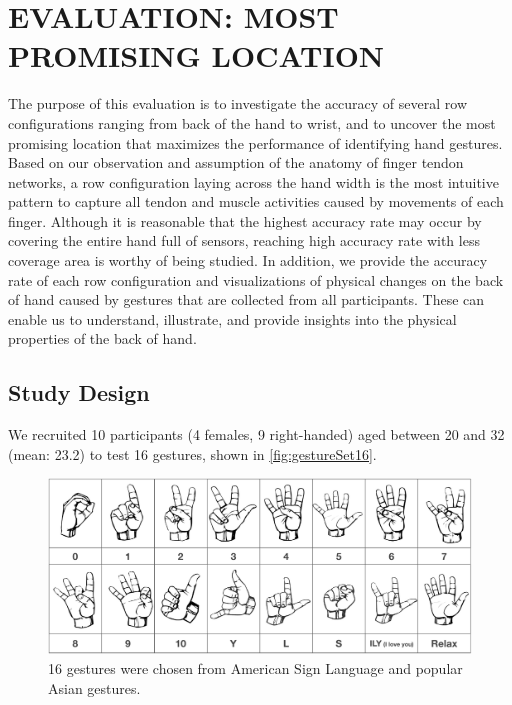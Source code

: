\documentclass{sigchi}
\begin{document}
\section{EVALUATION: MOST PROMISING LOCATION}

The purpose of this evaluation is to investigate the accuracy of several row configurations ranging from back of the hand to wrist, and to uncover the most promising location that maximizes the performance of identifying hand gestures. Based on our observation and assumption of the anatomy of finger tendon networks, a row configuration laying across the hand width is the most intuitive pattern to capture all tendon and muscle activities caused by movements of each finger. Although it is reasonable that the highest accuracy rate may occur by covering the entire hand full of sensors, reaching high accuracy rate with less coverage area is worthy of being studied.
In addition, we provide the accuracy rate of each row configuration and visualizations of physical changes on the back of hand caused by gestures that are collected from all participants. These can enable us to understand, illustrate, and provide insights into the physical properties of the back of hand. %

\subsection{Study Design}
We recruited 10 participants (4 females, 9 right-handed) aged between 20 and 32 (mean: 23.2) to test 16 gestures, shown in \autoref{fig:gestureSet16}.

\begin{figure}[b]
  \begin{center}
  \includegraphics[width=1\columnwidth]{figures/gestureSet_16_v3.pdf}
  \caption{16 gestures were chosen from American Sign Language and popular Asian gestures.}
  \label{fig:gestureSet16}
  \end{center}
\end{figure}
\end{document}
